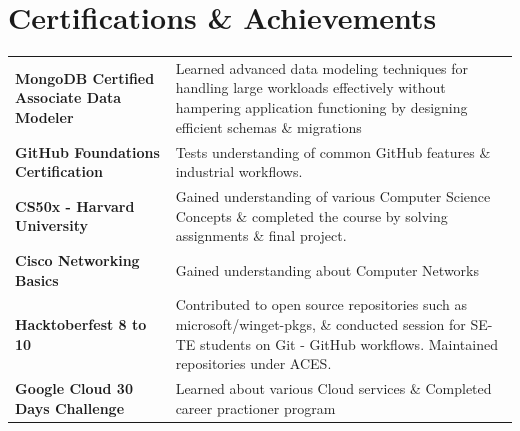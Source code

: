 \documentclass[a4paper,10pt]{article}
\begin{document}
\section{Certifications \& Achievements}
\begin{tabularx}{\linewidth}{@{}l X@{}}
    \textbf{MongoDB Certified Associate Data Modeler} & \normalsize{Learned advanced data modeling techniques for handling large workloads effectively without hampering application functioning by designing efficient schemas \& migrations}\\
    \textbf{GitHub Foundations Certification} & \normalsize{Tests understanding of common GitHub features \& industrial workflows.}\\
    \textbf{CS50x - Harvard University} & \normalsize{Gained understanding of various Computer Science Concepts \& completed the course by solving assignments \& final project.}\\
    \textbf{Cisco Networking Basics} &  \normalsize{Gained understanding about Computer Networks}\\
    \textbf{Hacktoberfest 8 to 10}  &  \normalsize{ Contributed to open source repositories such as microsoft/winget-pkgs, \& conducted session for SE-TE students on Git - GitHub workflows. Maintained repositories under ACES. }\\
    \textbf{Google Cloud 30 Days Challenge} &  \normalsize{Learned about various Cloud services \& Completed career practioner program}\\
\end{tabularx}

\vspace*{5mm}
\end{document}
